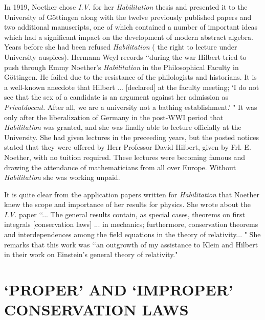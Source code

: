 In 1919, Noether chose {\it{I.V.}} for her {\it{Habilitation}} thesis and presented it
to the University of G\"{o}ttingen along with the twelve previously published
papers and two additional  manuscripts, one of which \cite{schm} contained a
number of important ideas which had a significant impact on the development of
modern abstract algebra. Years before she had been refused {\it{Habilitation}} 
( the right to lecture under University auspices).  Hermann Weyl records
\cite{weyl} \lq\lq during the war Hilbert tried to push through Emmy Noether's
{\it{Habilitation}} in the Philosophical Faculty in G\"{o}ttingen. He failed
due to the resistance of the philologists and historians.  It is a well-known
anecdote that Hilbert ... [declared] at the faculty meeting; \lq I do not see
that the sex of a candidate is an argument against her admission as
{\it{Privatdocent}}. After all, we are a university not a bathing
establishment.' " It was only after the liberalization of Germany in the
post-WWI period that   {\it{ Habilitation}} was granted, and she was finally
able to lecture officially at the University. She had given lectures in the
preceeding years, but the posted notices  stated that they were offered by Herr
Professor David Hilbert,  given by Frl. E. Noether,  with no tuition required.
These  lectures were becoming famous and drawing the attendance of
mathematicians from all over Europe.  Without {\it{Habilitation}} she was
working unpaid.

It is quite clear from                     the application papers written for
{\it{Habilitation}} that Noether knew the scope and importance of her results
for physics. She wrote about the {\it{I.V.}} paper \cite{Dick} \lq\lq ...  The general
results  contain, as special cases, theorems on first integrals [conservation
laws] ... in mechanics; furthermore, conservation theorems and interdependences
among the field equations in the theory of relativity... " She remarks 
that this work was \lq\lq an outgrowth of my assistance to Klein and Hilbert in
their work on Einstein's  general theory of relativity."
\section{`PROPER' AND  `IMPROPER' CONSERVATION LAWS}


